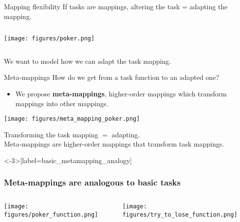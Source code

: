 \documentclass{beamer}
\begin{document}
\begin{frame}{Mapping flexibility}
If tasks are mappings, altering the task = adapting the mapping. 
\begin{columns}
\begin{column}{0.5\textwidth}
\vspace{2em}
\texttt{[image: figures/poker.png]}
\end{column}
\begin{column}{0.5\textwidth}
\vspace{2em}
\end{column}
\end{columns}
\end{frame}

\begin{frame}[standout]
We want to model how we can adapt the task mapping.
\end{frame}

\begin{frame}{Meta-mappings}
How do we get from a task function to an adapted one?
\begin{itemize}
\item We propose \textbf{meta-mappings}, higher-order mappings which transform mappings into other mappings.
\end{itemize}
\texttt{[image: figures/meta\_mapping\_poker.png]}
\end{frame}

\begin{frame}[standout]
Transforming the task mapping \(=\) adapting. \\[1em]
Meta-mappings are higher-order mappings that transform task mappings.
\end{frame}

\begin{frame}<-3>[label=basic_metamapping_analogy]
\frametitle{Meta-mappings are analogous to basic tasks}
\begin{columns}
\begin{column}{0.5\textwidth}
\vspace{2em}
\texttt{[image: figures/poker\_function.png]}
\end{column}
\begin{column}{0.5\textwidth}
\vspace{2em}
\texttt{[image: figures/try\_to\_lose\_function.png]}
\end{column}
\end{columns}
\end{frame}
\end{document}
